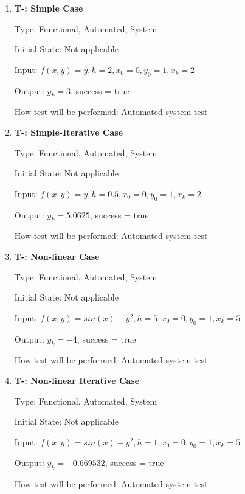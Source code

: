 \documentclass[12pt, titlepage]{article}
\newcounter{tnum} %
\begin{document}
\begin{enumerate}

\item{\textbf{T-\thetnum \label{t-euler_simple}: Simple Case}}

Type: Functional, Automated, System %
					
Initial State: Not applicable
					
Input: $f(x, y) = y, h = 2, x_0 = 0, y_0 = 1, x_k = 2$
					
Output: $y_k = 3$, success = true
					
How test will be performed: Automated system test  

\item{\textbf{T-\thetnum \label{t-euler_simpleiterative}: Simple-Iterative Case}}

Type: Functional, Automated, System %
					
Initial State: Not applicable
					
Input: $f(x, y) = y, h = 0.5, x_0 = 0, y_0 = 1, x_k = 2$
					
Output: $y_k = 5.0625$, success = true
					
How test will be performed: Automated system test

\item{\textbf{T-\thetnum \label{t-euler_nonlinear}: Non-linear Case}}

Type: Functional, Automated, System %
					
Initial State: Not applicable
					
Input: $f(x, y) = sin(x) - y^2, h = 5, x_0 = 0, y_0 = 1, x_k = 5$
					
Output: $y_k = -4$, success = true
					
How test will be performed: Automated system test

\item{\textbf{T-\thetnum \label{t-euler_nonlineariterative}: Non-linear Iterative Case}}

Type: Functional, Automated, System %
					
Initial State: Not applicable
					
Input: $f(x, y) = sin(x) - y^2, h = 1, x_0 = 0, y_0 = 1, x_k = 5$
					
Output: $y_k = -0.669532$, success = true
					
How test will be performed: Automated system test

\end{enumerate}
\end{document}
